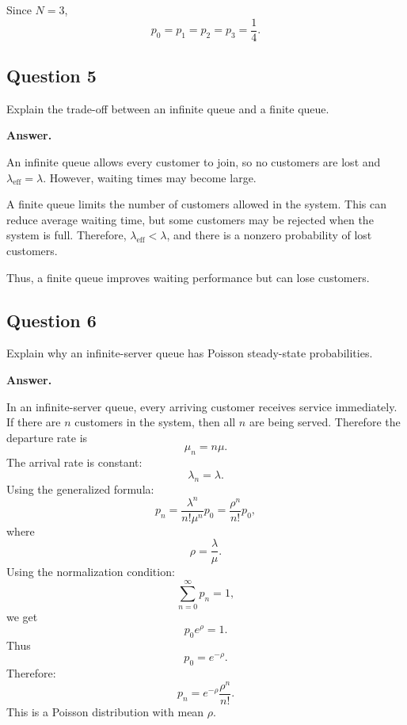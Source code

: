\documentclass[12pt]{article}
\begin{document}
Since \(N=3\),
\[
\boxed{
p_0=p_1=p_2=p_3=\frac14.
}
\]

\subsection*{Question 5}

Explain the trade-off between an infinite queue and a finite queue.

\textbf{Answer.}

An infinite queue allows every customer to join, so no customers are lost and \(\lambda_{\text{eff}}=\lambda\). However, waiting times may become large.

A finite queue limits the number of customers allowed in the system. This can reduce average waiting time, but some customers may be rejected when the system is full. Therefore, \(\lambda_{\text{eff}}<\lambda\), and there is a nonzero probability of lost customers.

Thus, a finite queue improves waiting performance but can lose customers.

\subsection*{Question 6}

Explain why an infinite-server queue has Poisson steady-state probabilities.

\textbf{Answer.}

In an infinite-server queue, every arriving customer receives service immediately. If there are \(n\) customers in the system, then all \(n\) are being served. Therefore the departure rate is
\[
\mu_n=n\mu.
\]
The arrival rate is constant:
\[
\lambda_n=\lambda.
\]
Using the generalized formula:
\[
p_n
=
\frac{\lambda^n}{n!\mu^n}p_0
=
\frac{\rho^n}{n!}p_0,
\]
where
\[
\rho=\frac{\lambda}{\mu}.
\]
Using the normalization condition:
\[
\sum_{n=0}^{\infty}p_n=1,
\]
we get
\[
p_0e^\rho=1.
\]
Thus
\[
p_0=e^{-\rho}.
\]
Therefore:
\[
\boxed{
p_n=e^{-\rho}\frac{\rho^n}{n!}.
}
\]
This is a Poisson distribution with mean \(\rho\).
\end{document}
